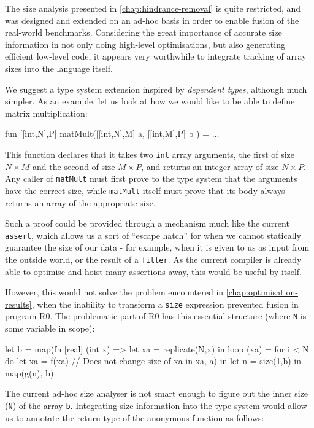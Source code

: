 The size analysis presented in \cref{chap:hindrance-removal} is quite
restricted, and was designed and extended on an ad-hoc basis in order
to enable fusion of the real-world benchmarks.  Considering the great
importance of accurate size information in not only doing high-level
optimisations, but also generating efficient low-level code, it
appears very worthwhile to integrate tracking of array sizes into the
language itself.

We suggest a type system extension inspired by \textit{dependent
  types}, although much simpler.  As an example, let us look at how we
would like to be able to define matrix multiplication:

\begin{colorcode}
fun [[int,N],P] matMult([[int,N],M] a, [[int,M],P] b ) =
  ...
\end{colorcode}

This function declares that it takes two \texttt{int} array arguments,
the first of size $N \times M$ and the second of size $M \times P$,
and returns an integer array of size $N \times P$.  Any caller of
\texttt{matMult} must first prove to the type system that the
arguments have the correct size, while \texttt{matMult} itself must
prove that its body always returns an array of the appropriate size.

Such a proof could be provided through a mechanism much like the
current \texttt{assert}, which allows us a sort of ``escape hatch''
for when we cannot statically guarantee the size of our data - for
example, when it is given to us as input from the outside world, or
the result of a \texttt{filter}.  As the current \LO{} compiler is
already able to optimise and hoist many assertions away, this would be
useful by itself.

However, this would not solve the problem encountered in
\cref{chap:optimisation-results}, when the inability to transform a
\texttt{size} expression prevented fusion in program R0.  The
problematic part of R0 has this essential structure (where \texttt{N}
is some variable in scope):

\begin{colorcode}
let b = map(fn [real] (int x) =>
              let xa = replicate(N,x) in
              loop (xa) = for i < N do
                let xa = f(xa) // Does not change size of xa
                in
              xa,
            a) in
let n = size(1,b) in
map(g(n), b)
\end{colorcode}

The current ad-hoc size analyser is not smart enough to figure out the
inner size (\texttt{N}) of the array \texttt{b}.  Integrating size
information into the type system would allow us to annotate the return
type of the anonymous function as follows:

